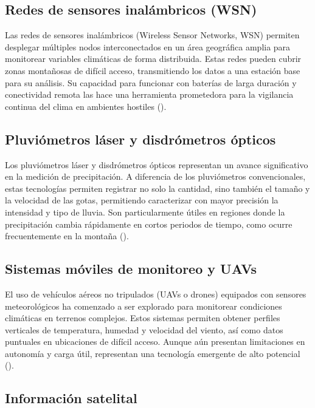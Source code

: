 \subsection{Redes de sensores inalámbricos (WSN)}

Las redes de sensores inalámbricos (Wireless Sensor Networks, WSN) permiten desplegar múltiples nodos interconectados en un área geográfica amplia para monitorear variables climáticas de forma distribuida. Estas redes pueden cubrir zonas montañosas de difícil acceso, transmitiendo los datos a una estación base para su análisis. Su capacidad para funcionar con baterías de larga duración y conectividad remota las hace una herramienta prometedora para la vigilancia continua del clima en ambientes hostiles (\cite{matese2009wireless}).

\subsection{Pluviómetros láser y disdrómetros ópticos}

Los pluviómetros láser y disdrómetros ópticos representan un avance significativo en la medición de precipitación. A diferencia de los pluviómetros convencionales, estas tecnologías permiten registrar no solo la cantidad, sino también el tamaño y la velocidad de las gotas, permitiendo caracterizar con mayor precisión la intensidad y tipo de lluvia. Son particularmente útiles en regiones donde la precipitación cambia rápidamente en cortos periodos de tiempo, como ocurre frecuentemente en la montaña (\cite{lenz2017optical}).

\subsection{Sistemas móviles de monitoreo y UAVs}

El uso de vehículos aéreos no tripulados (UAVs o drones) equipados con sensores meteorológicos ha comenzado a ser explorado para monitorear condiciones climáticas en terrenos complejos. Estos sistemas permiten obtener perfiles verticales de temperatura, humedad y velocidad del viento, así como datos puntuales en ubicaciones de difícil acceso. Aunque aún presentan limitaciones en autonomía y carga útil, representan una tecnología emergente de alto potencial  (\cite{villa2016uav}).


\subsection{Información satelital}


